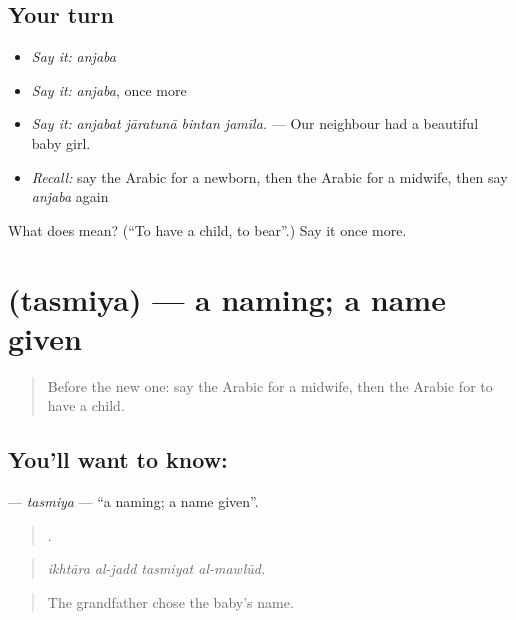 \subsection*{Your turn}
\begin{itemize}
\raggedright
  \item \emph{Say it:} \emph{anjaba}
  \item \emph{Say it:} \emph{anjaba}, once more
  \item \emph{Say it:} \emph{anjabat jāratunā bintan jamīla.} — Our neighbour had a beautiful baby girl.
  \item \emph{Recall:} say the Arabic for a newborn, then the Arabic for a midwife, then say \emph{anjaba} again
\end{itemize}

\begin{tcolorbox}[breakable,colback=teal!4,colframe=teal!35!black,title={Before you move on}]
What does  mean? (\textquotedblleft{}To have a child, to bear\textquotedblright{}.) Say it once more.
\end{tcolorbox}
\section[\texorpdfstring{\ar{تسمية} (tasmiya)}{تسمية (tasmiya)}]{ (tasmiya) — a naming; a name given}

\label{lesson:AR-C311-tasmiya}



\begin{quote}
Before the new one: say the Arabic for a midwife, then the Arabic for to have a child.
\end{quote}

\subsection*{You'll want to know: }
\textbf{} — \emph{tasmiya} — \textquotedblleft{}a naming; a name given\textquotedblright{}.

\begin{quote}
   .
\end{quote}

\begin{quote}
\emph{ikhtāra al-jadd tasmiyat al-mawlūd.}
\end{quote}

\begin{quote}
The grandfather chose the baby’s name.
\end{quote}

